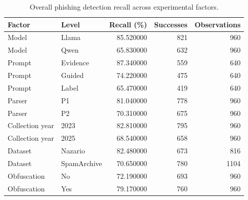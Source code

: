\begin{table}[t]
\caption{Overall phishing detection recall across experimental factors.}
\label{tab:overall_recall}
\begin{tabular}{llrrr}
\toprule
Factor & Level & Recall (\%) & Successes & Observations \\
\midrule
Model & Llama & 85.520000 & 821 & 960 \\
Model & Qwen & 65.830000 & 632 & 960 \\
Prompt & Evidence & 87.340000 & 559 & 640 \\
Prompt & Guided & 74.220000 & 475 & 640 \\
Prompt & Label & 65.470000 & 419 & 640 \\
Parser & P1 & 81.040000 & 778 & 960 \\
Parser & P2 & 70.310000 & 675 & 960 \\
Collection year & 2023 & 82.810000 & 795 & 960 \\
Collection year & 2025 & 68.540000 & 658 & 960 \\
Dataset & Nazario & 82.480000 & 673 & 816 \\
Dataset & SpamArchive & 70.650000 & 780 & 1104 \\
Obfuscation & No & 72.190000 & 693 & 960 \\
Obfuscation & Yes & 79.170000 & 760 & 960 \\
\bottomrule
\end{tabular}
\end{table}
